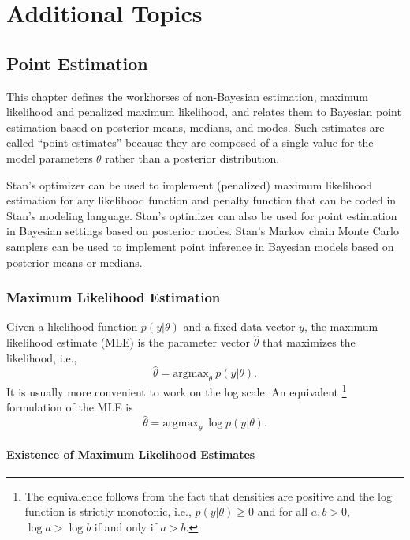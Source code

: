 \part{Additional Topics}


\chapter{Point Estimation}\label{mle.chapter}

\noindent
This chapter defines the workhorses of non-Bayesian estimation,
maximum likelihood and penalized maximum likelihood, and relates them
to Bayesian point estimation based on posterior means, medians, and
modes.  Such estimates are called ``point estimates'' because they
are composed of a single value for the model parameters $\theta$
rather than a posterior distribution.

Stan's optimizer can be used to implement (penalized) maximum
likelihood estimation for any likelihood function and penalty function
that can be coded in Stan's modeling language.  Stan's optimizer can
also be used for point estimation in Bayesian settings based on
posterior modes.  Stan's Markov chain Monte Carlo samplers can be used
to implement point inference in Bayesian models based on posterior
means or medians.

\section{Maximum Likelihood Estimation}\label{mle.section}

Given a likelihood function $p(y|\theta)$ and a fixed data vector $y$,
the maximum likelihood estimate (MLE) is the parameter vector $\hat{\theta}$
that maximizes the likelihood, i.e.,
\[
\hat{\theta} = \mbox{argmax}_{\theta} \ p(y|\theta).
\]
It is usually more convenient to work on the log scale.
An equivalent%
%
\footnote{The equivalence follows from the fact that densities are
  positive and the log function is strictly monotonic, i.e.,
  $p(y|\theta) \geq 0$ and for all $a, b > 0$, $\log a > \log b$ if and
  only if $a > b$.}
%
formulation of the MLE is
%
\[
\hat{\theta} = \mbox{argmax}_{\theta} \ \log p(y|\theta).
\]

\subsection{Existence of Maximum Likelihood Estimates}

